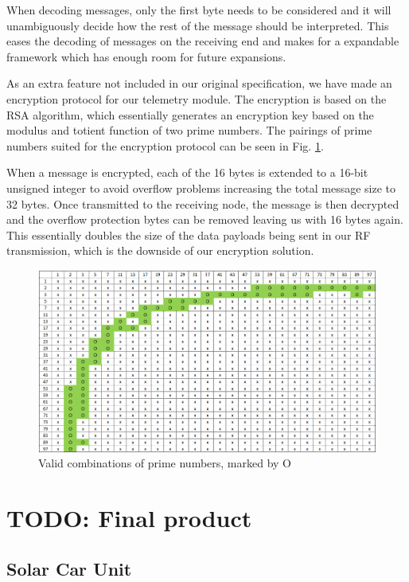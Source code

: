 \documentclass[conference]{IEEEtran}
\newcommand{\todo}[1]{{\color{olive} TODO: #1}}
\begin{document}
When decoding messages, only the first byte needs to be considered and it will unambiguously decide how the rest of the message should be interpreted. This eases the decoding of messages on the receiving end and makes for a expandable framework which has enough room for future expansions. 

As an extra feature not included in our original specification, we have made an encryption protocol for our telemetry module. The encryption is based on the RSA algorithm, which essentially generates an encryption key based on the modulus and totient function of two prime numbers. The pairings of prime numbers suited for the encryption protocol can be seen in Fig. \ref{fig:prime_tabel}. 

When a message is encrypted, each of the 16 bytes is extended to a 16-bit unsigned integer to avoid overflow problems increasing the total message size to 32 bytes. Once transmitted to the receiving node, the message is then decrypted and the overflow protection bytes can be removed leaving us with 16 bytes again. This essentially doubles the size of the data payloads being sent in our RF transmission, which is the downside of our encryption solution.

\begin{figure}
    \centering
    \includegraphics[width=\linewidth]{documentation/images/prime_tabel.png}
    \caption{Valid combinations of prime numbers, marked by O}
    \label{fig:prime_tabel}
\end{figure}


\section{\todo{Final product}}
\subsection{Solar Car Unit}
\end{document}
